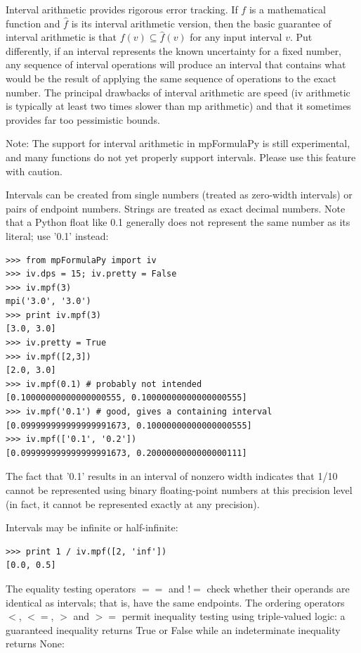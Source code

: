 \vpara
Interval arithmetic provides rigorous error tracking. If  $f$ is a mathematical function and $\hat{f}$ is its interval arithmetic version, then the basic guarantee of interval arithmetic is that $f(v) \subseteq \hat{f}(v)$ for any input interval $v$. Put differently, if an interval represents the known uncertainty for a fixed number, any sequence of interval operations will produce an interval that contains what would be the result of applying the same sequence of operations to the exact number. The principal drawbacks of interval arithmetic are speed (iv arithmetic is typically at least two times slower than mp arithmetic) and that it sometimes provides far too pessimistic bounds.

\vpara
Note: The support for interval arithmetic in mpFormulaPy is still experimental, and many functions do not yet properly support intervals. Please use this feature with caution.

\vpara
Intervals can be created from single numbers (treated as zero-width intervals) or pairs of endpoint numbers. Strings are treated as exact decimal numbers. Note that a Python float like 0.1 generally does not represent the same number as its literal; use '0.1' instead:

\begin{lstlisting}
>>> from mpFormulaPy import iv
>>> iv.dps = 15; iv.pretty = False
>>> iv.mpf(3)
mpi('3.0', '3.0')
>>> print iv.mpf(3)
[3.0, 3.0]
>>> iv.pretty = True
>>> iv.mpf([2,3])
[2.0, 3.0]
>>> iv.mpf(0.1) # probably not intended
[0.10000000000000000555, 0.10000000000000000555]
>>> iv.mpf('0.1') # good, gives a containing interval
[0.099999999999999991673, 0.10000000000000000555]
>>> iv.mpf(['0.1', '0.2'])
[0.099999999999999991673, 0.2000000000000000111]
\end{lstlisting}


The fact that '0.1' results in an interval of nonzero width indicates that 1/10 cannot be represented using binary floating-point numbers at this precision level (in fact, it cannot be represented exactly at any precision).

\vpara
Intervals may be infinite or half-infinite:

\begin{lstlisting}
>>> print 1 / iv.mpf([2, 'inf'])
[0.0, 0.5]
\end{lstlisting}


The equality testing operators $==$ and $!=$ check whether their operands are identical as intervals; that is, have the same endpoints. The ordering operators $<$,  $<=$,  $>$ and $>=$ permit inequality testing using triple-valued logic: a guaranteed inequality returns True or False while an indeterminate inequality returns None:


